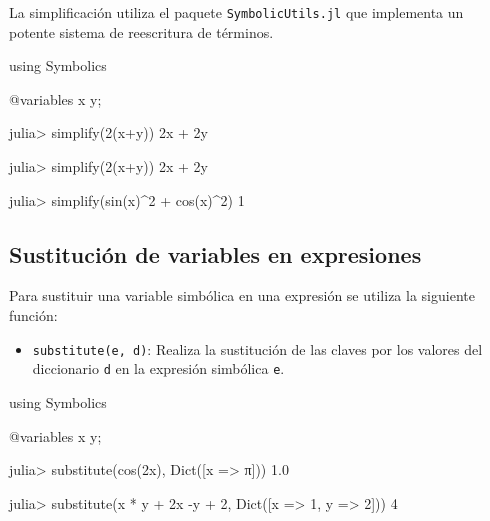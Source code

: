 \documentclass[
  letterpaper,
  DIV=11,
  numbers=noendperiod]{scrreprt}
\newenvironment{Shaded}{\begin{snugshade}}{\end{snugshade}}
\newcommand{\BuiltInTok}[1]{\textcolor[rgb]{0.00,0.23,0.31}{#1}}
\newcommand{\ConstantTok}[1]{\textcolor[rgb]{0.56,0.35,0.01}{#1}}
\newcommand{\FloatTok}[1]{\textcolor[rgb]{0.68,0.00,0.00}{#1}}
\newcommand{\FunctionTok}[1]{\textcolor[rgb]{0.28,0.35,0.67}{#1}}
\newcommand{\ImportTok}[1]{\textcolor[rgb]{0.00,0.46,0.62}{#1}}
\newcommand{\NormalTok}[1]{\textcolor[rgb]{0.00,0.23,0.31}{#1}}
\newcommand{\OperatorTok}[1]{\textcolor[rgb]{0.37,0.37,0.37}{#1}}
\newcommand{\PreprocessorTok}[1]{\textcolor[rgb]{0.68,0.00,0.00}{#1}}
\providecommand{\tightlist}{%
  \setlength{\itemsep}{0pt}\setlength{\parskip}{0pt}}\usepackage{longtable,booktabs,array}
\begin{document}
La simplificación utiliza el paquete \texttt{SymbolicUtils.jl} que
implementa un potente sistema de reescritura de términos.

\begin{Shaded}
\begin{Highlighting}[]
\ImportTok{using} \BuiltInTok{Symbolics}

\PreprocessorTok{@variables}\NormalTok{ x y;}

\NormalTok{julia}\OperatorTok{\textgreater{}} \FunctionTok{simplify}\NormalTok{(}\FloatTok{2}\NormalTok{(x}\OperatorTok{+}\NormalTok{y))}
\FloatTok{2}\NormalTok{x }\OperatorTok{+} \FloatTok{2}\NormalTok{y}

\NormalTok{julia}\OperatorTok{\textgreater{}} \FunctionTok{simplify}\NormalTok{(}\FloatTok{2}\NormalTok{(x}\OperatorTok{+}\NormalTok{y))}
\FloatTok{2}\NormalTok{x }\OperatorTok{+} \FloatTok{2}\NormalTok{y}

\NormalTok{julia}\OperatorTok{\textgreater{}} \FunctionTok{simplify}\NormalTok{(}\FunctionTok{sin}\NormalTok{(x)}\OperatorTok{\^{}}\FloatTok{2} \OperatorTok{+} \FunctionTok{cos}\NormalTok{(x)}\OperatorTok{\^{}}\FloatTok{2}\NormalTok{)}
\FloatTok{1}
\end{Highlighting}
\end{Shaded}

\hypertarget{sustituciuxf3n-de-variables-en-expresiones}{%
\subsection{Sustitución de variables en
expresiones}\label{sustituciuxf3n-de-variables-en-expresiones}}

Para sustituir una variable simbólica en una expresión se utiliza la
siguiente función:

\begin{itemize}
\tightlist
\item
  \texttt{substitute(e,\ d)}: Realiza la sustitución de las claves por
  los valores del diccionario \texttt{d} en la expresión simbólica
  \texttt{e}.
\end{itemize}

\begin{Shaded}
\begin{Highlighting}[]
\ImportTok{using} \BuiltInTok{Symbolics}

\PreprocessorTok{@variables}\NormalTok{ x y;}

\NormalTok{julia}\OperatorTok{\textgreater{}} \FunctionTok{substitute}\NormalTok{(}\FunctionTok{cos}\NormalTok{(}\FloatTok{2}\NormalTok{x), }\FunctionTok{Dict}\NormalTok{([x }\OperatorTok{=\textgreater{}} \ConstantTok{π}\NormalTok{])) }
\FloatTok{1.0}

\NormalTok{julia}\OperatorTok{\textgreater{}} \FunctionTok{substitute}\NormalTok{(x }\OperatorTok{*}\NormalTok{ y }\OperatorTok{+} \FloatTok{2}\NormalTok{x }\OperatorTok{{-}}\NormalTok{y }\OperatorTok{+} \FloatTok{2}\NormalTok{, }\FunctionTok{Dict}\NormalTok{([x }\OperatorTok{=\textgreater{}} \FloatTok{1}\NormalTok{, y }\OperatorTok{=\textgreater{}} \FloatTok{2}\NormalTok{]))}
\FloatTok{4}
\end{Highlighting}
\end{Shaded}
\end{document}
